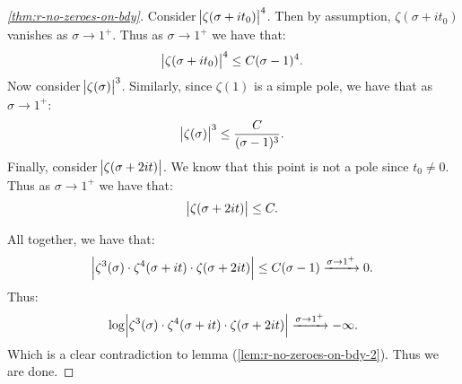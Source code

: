 \begin{proof}[\ref{thm:r-no-zeroes-on-bdy}]
Consider $\abs{\zeta(\sigma+i t_0) }^4$. Then by assumption, $\zeta(\sigma+i t_0)$ vanishes as $\sigma \to 1^+$. Thus as $\sigma \to 1^+$ we have that:
\begin{align*}
    \abs{\zeta(\sigma+i t_0) }^4 \leq C (\sigma - 1)^4.
\end{align*}
Now consider $\abs{\zeta(\sigma)}^3$. Similarly, since $\zeta(1)$ is a simple pole, we have that as $\sigma \to 1^+$:
\begin{align*}
    \abs{\zeta(\sigma)}^3 \leq \frac{C}{(\sigma - 1)^3}.
\end{align*}
Finally, consider $\abs{\zeta(\sigma + 2 it) }$. We know that this point is not a pole since $t_0 \neq 0$. Thus as $\sigma \to 1^+$ we have that:
\begin{align*}
    \abs{\zeta(\sigma + 2 it) } \leq C.
\end{align*}

All together, we have that:
\begin{align*}
    \abs{ \zeta^3 (\sigma) \cdot \zeta^4 (\sigma+it) \cdot \zeta(\sigma + 2 it) } \leq C (\sigma - 1) \xrightarrow[]{ \sigma \to 1^+} 0.
\end{align*}
Thus:
\begin{align*}
    \log \abs{ \zeta^3 (\sigma) \cdot \zeta^4 (\sigma+it) \cdot \zeta(\sigma + 2 it) }  \xrightarrow[]{ \sigma \to 1^+} - \infty.
\end{align*}
Which is a clear contradiction to lemma (\ref{lem:r-no-zeroes-on-bdy-2}). Thus we are done.
\end{proof}






























